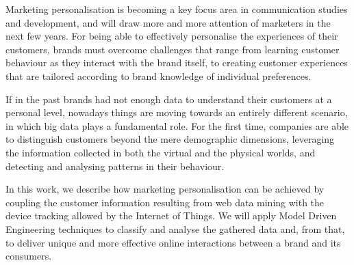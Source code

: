 \renewcommand{\sfdefault}{phv}
Marketing personalisation is becoming a key focus area in communication studies and development, and will draw more and more attention of marketers in the next few years. For being able to effectively personalise the experiences of their customers, brands must overcome challenges that range from learning customer behaviour as they interact with the brand itself, to creating customer experiences that are tailored according to brand knowledge of individual preferences.

If in the past brands had not enough data to understand their customers at a personal level, nowadays things are moving towards an entirely different scenario, in which big data plays a fundamental role. For the first time, companies are able to distinguish customers beyond the mere demographic dimensions, leveraging the information collected in both the virtual and the physical worlds, and detecting  and analysing patterns in their behaviour.

In this work, we describe how marketing personalisation can be achieved by coupling  the customer information resulting from web data mining with the device tracking allowed by the Internet of Things. We will apply Model Driven Engineering techniques to classify and analyse the gathered data and, from that, to deliver unique and more effective online interactions between a brand and its consumers.
